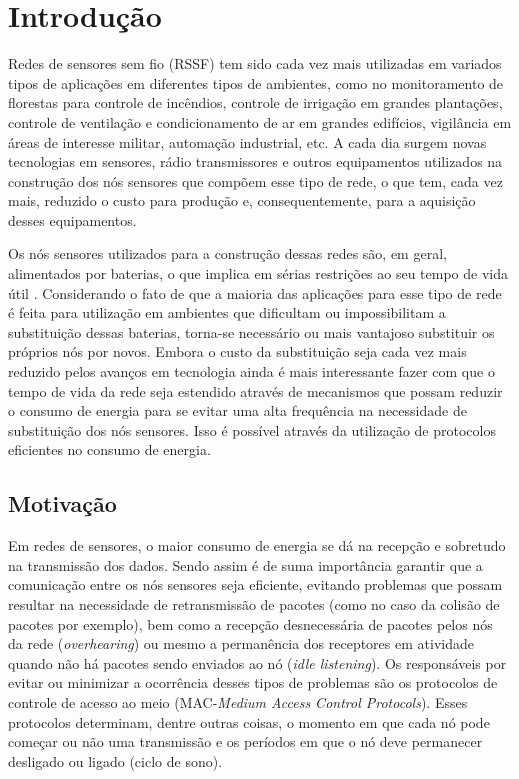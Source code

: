 \section{Introdução}

Redes de sensores sem fio (RSSF) tem sido cada vez mais utilizadas em variados tipos de aplicações em diferentes tipos de ambientes, como no monitoramento de florestas para controle de incêndios, controle de irrigação em grandes plantações, controle de ventilação e condicionamento de ar em grandes edifícios, vigilância em áreas de interesse militar, automação industrial, etc. A cada dia surgem novas tecnologias em sensores, rádio transmissores e outros equipamentos utilizados na construção dos nós sensores que compõem esse tipo de rede, o que tem, cada vez mais, reduzido o custo para produção e, consequentemente, para a aquisição desses equipamentos.

Os nós sensores utilizados para a construção dessas redes são, em geral, alimentados por baterias, o que implica em sérias restrições ao seu tempo de vida útil \cite{Akyildiz2002a}. Considerando o fato de que a maioria das aplicações para esse tipo de rede é feita para utilização em ambientes que dificultam ou impossibilitam a substituição dessas baterias, torna-se necessário ou mais vantajoso substituir os próprios nós por novos. Embora o custo da substituição seja cada vez mais reduzido pelos avanços em tecnologia ainda é mais interessante fazer com que o tempo de vida da rede seja estendido através de mecanismos que possam reduzir o consumo de energia para se evitar uma alta frequência na necessidade de substituição dos nós sensores. Isso é possível através da utilização de protocolos eficientes no consumo de energia. 

\subsection{Motivação}

Em redes de sensores, o maior consumo de energia se dá na recepção e sobretudo na transmissão dos dados. Sendo assim é de suma importância garantir que a comunicação entre os nós sensores seja eficiente, evitando problemas que possam resultar na necessidade de retransmissão de pacotes (como no caso da colisão de pacotes por exemplo), bem como a recepção desnecessária de pacotes pelos nós da rede (\emph{overhearing}) ou mesmo a permanência dos receptores em atividade quando não há pacotes sendo enviados ao nó (\emph{idle listening}). Os responsáveis por evitar ou minimizar a ocorrência desses tipos de problemas são os protocolos de controle de acesso ao meio (MAC-\emph{Medium Access Control Protocols}). Esses protocolos determinam, dentre outras coisas, o momento em que cada nó pode começar ou não uma transmissão e os períodos em que o nó deve permanecer desligado ou ligado (ciclo de sono).


